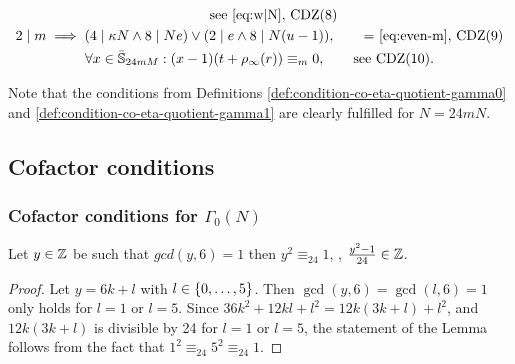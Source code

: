 \documentclass{article}
\begin{document}
\begin{Definition}
\begin{gather}
    \qquad
    \text{see \eqref{eq:w|N}, CDZ(8)}
    \label{eq:conditionNDivosor?(nn,rspec,m,t)}
    \\
    2 \mid m \implies (4 \mid \kappa N \land 8 \mid N e)
    \lor
    (2 \mid e \land 8 \mid N(u-1)),
    \qquad
    \text{= \eqref{eq:even-m}, CDZ(9)}
    \label{eq:conditionEvenMultiplier?(nn,rspec,m)}
    \\
    \forall x\in\bar{\mathbb{S}}_{24mM}: (x-1) (t + \rho_\infty(r))
    \equiv_m 0,
    \qquad
    \text{see CDZ(10)}.
    \label{eq:conditionOrbitLength?(nn,mm,r,rtilde,m,t)}
  \end{gather}
  \endgroup
\end{Definition}






Note that the conditions from Definitions
\ref{def:condition-co-eta-quotient-gamma0} and
\ref{def:condition-co-eta-quotient-gamma1} are clearly fulfilled for
$N=24mN$.




\subsection{Cofactor conditions}

\subsubsection{Cofactor conditions for $\Gamma_0(N)$}


\begin{AdditionalInformation}
\begin{Lemma}\label{thm:y^2-1}
  Let $y\in \mathbb{Z}$ be such that $gcd(y, 6)=1$ then
  $y^2 \equiv_{24} 1$, \ie, $ \frac{y^2-1}{24} \in \mathbb{Z}$.
\end{Lemma}
\begin{proof}
  Let $y = 6k + l$ with $l \in \left\{0,\ldots,5\right\}$. Then
  $\gcd(y, 6)=\gcd(l,6)=1$ only holds for $l=1$ or $l=5$.
  Since $36 k^2 + 12 k l + l^2 = 12k(3k+l) + l^2$, and $12k(3k+l)$ is
  divisible by 24 for $l=1$ or $l=5$, the statement of the Lemma
  follows from the fact that $1^2\equiv_{24} 5^2 \equiv_{24} 1$.
\end{proof}
\end{AdditionalInformation}
\end{document}
